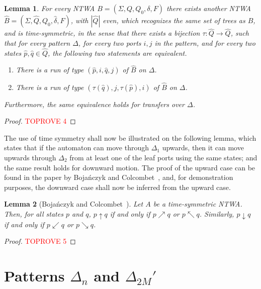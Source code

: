 \documentclass[12pt,a4paper]{article}
\newtheorem{lemma}{Lemma}
\theoremstyle{definition}
\begin{document}
\begin{lemma}\label{symmetries_lemma}
For every NTWA $B=(\Sigma, Q, Q_0, \delta, F)$
there exists another NTWA $\widehat{B}=(\Sigma, \widehat{Q}, Q_0, \widehat{\delta}, F)$,
with $|\widehat{Q}|$ even,
which recognizes the same set of trees as $B$,
and is \emph{time-symmetric}, in the sense that
there exists a bijection $\tau \colon \widehat{Q} \to \widehat{Q}$,
such that for every pattern $\Delta$,
for every two ports $i, j$ in the pattern,
and for every two states $\widehat{p}, \widehat{q} \in \widehat{Q}$,
the following two statements are equivalent.
\begin{enumerate}
\item
	There is a run
	of type $(\widehat{p}, i, \widehat{q}, j)$ of $\widehat{B}$ on $\Delta$.
\item
	There is a run
	of type $(\tau(\widehat{q}), j, \tau(\widehat{p}), i)$ of $\widehat{B}$ on $\Delta$.
\end{enumerate}
Furthermore, the same equivalence holds for transfers over $\Delta$.
\end{lemma}
\begin{proof}\textcolor{red}{TOPROVE 4}\end{proof}

The use of time symmetry shall now be illustrated
on the following lemma, which states that
if the automaton can move through $\Delta_1$ upwards,
then it can move upwards through $\Delta_2$ from at least one of the leaf ports using the same states;
and the same result holds for downward motion.
The proof of the upward case can be found
in the paper by Boja\'nczyk and Colcombet~\cite{BojanczykColcombet_reg},
and, for demonstration purposes, the downward case shall now be inferred from the upward case.

\begin{lemma}[Boja\'nczyk and Colcombet~{\cite[Prop.~5.6]{BojanczykColcombet_reg}}]
\label{lemma_delta1_up_and_down}
Let $A$ be a time-symmetric NTWA.
Then, for all states $p$ and $q$, $p \uparrow q$ if and only if $p \nearrow q$ or $p \nwarrow q$.
Similarly, $p \downarrow q$ if and only if $p \swarrow q$ or $p \searrow q$.
\end{lemma}
\begin{proof}\textcolor{red}{TOPROVE 5}\end{proof}








\section{Patterns $\Delta_n$ and $\Delta_{2M}'$}\label{section_elements_with_and_without_errors}
\end{document}
